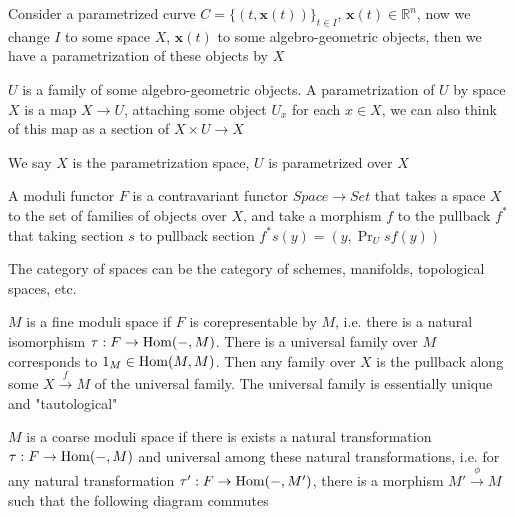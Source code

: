 \documentclass[main]{subfiles}
\begin{document}
Consider a parametrized curve $C=\{(t,\mathbf x(t))\}_{t\in I}$, $\mathbf x(t)\in\mathbb R^n$, now we change $I$ to some space $X$, $\mathbf x(t)$ to some algebro-geometric objects, then we have a parametrization of these objects by $X$

\begin{definition}
$U$ is a family of some algebro-geometric objects. A parametrization of $U$ by space $X$ is a map $X\to U$, attaching some object $U_x$ for each $x\in X$, we can also think of this map as a section of $X\times U\to X$ \par
We say $X$ is the parametrization space, $U$ is parametrized over $X$ \par
A moduli functor $F$ is a contravariant functor $Space\to Set$ that takes a space $X$ to the set of families of objects over $X$, and take a morphism $f$ to the pullback $f^*$ that taking section $s$ to pullback section $f^*s(y)=(y,\Pr_Usf(y))$
\begin{center}
\end{center}
The category of spaces can be the category of schemes, manifolds, topological spaces, etc. \par
$M$ is a fine moduli space if $F$ is corepresentable by $M$, i.e. there is a natural isomorphism $\tau:F\to\operatorname{Hom}(-,M)$. There is a universal family over $M$ corresponds to $1_M\in\operatorname{Hom}(M,M)$. Then any family over $X$ is the pullback along some $X\xrightarrow fM$ of the universal family. The universal family is essentially unique and "tautological" \par
$M$ is a coarse moduli space if there is exists a natural transformation $\tau:F\to\operatorname{Hom}(-,M)$ and universal among these natural transformations, i.e. for any natural transformation $\tau':F\to\operatorname{Hom}(-,M')$, there is a morphism $M'\xrightarrow\phi M$ such that the following diagram commutes
\begin{center}
\end{center}
\end{definition}
\end{document}
